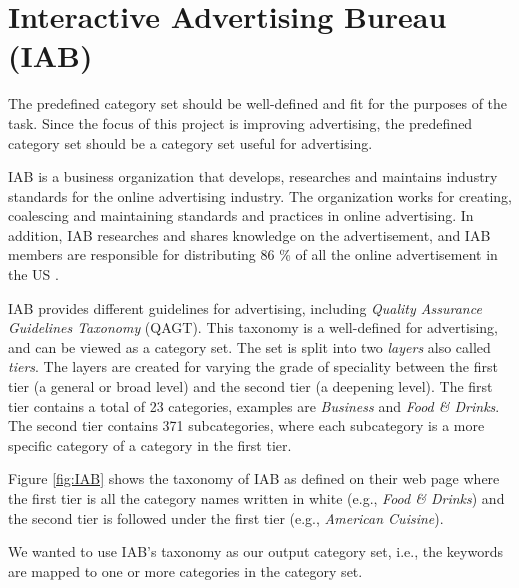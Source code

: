 \section{Interactive Advertising Bureau (IAB)}
The predefined category set should be well-defined and fit for the purposes of the task. Since the focus of this project is improving advertising, the predefined category set should be a category set useful for advertising. 




IAB is a business organization that develops, researches and maintains industry standards for the online advertising industry. The organization works for creating, coalescing and maintaining standards and practices in online advertising. In addition, IAB researches and shares knowledge on the advertisement, and IAB members are responsible for distributing 86 \% of all the online advertisement in the US \cite{IABabout}.

IAB provides different guidelines for advertising, including \emph{Quality Assurance Guidelines Taxonomy} (QAGT). This taxonomy is a well-defined for advertising, and can be viewed as a category set. The set is split into two \emph{layers} also called \emph{tiers}. The layers are created for varying the grade of speciality between the first tier (a general or broad level) and the second tier (a deepening level). The first tier contains a total of 23 categories, examples are \emph{Business} and \emph{Food \& Drinks}. The second tier contains 371 subcategories, where each subcategory is a more specific category of a category in the first tier. 

Figure \ref{fig:IAB} shows the taxonomy of IAB as defined on their web page where the first tier is all the category names written in white (e.g., \emph{Food \& Drinks}) and the second tier is followed under the first tier (e.g., \emph{American Cuisine}). 

We wanted to use IAB's taxonomy as our output category set, i.e., the keywords are mapped to one or more categories in the category set. 


